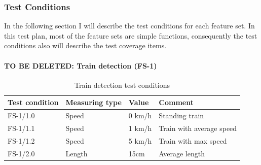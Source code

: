 \subsubsection{Test Conditions} In the following section I will describe the test conditions for each feature set. In this test plan, most of the feature sets are simple functions, consequently the test conditions also will describe the test coverage items.
\paragraph{TO BE DELETED: Train detection (FS-1)}
\begin{table}[H]
\caption{Train detection test conditions}
\label{table:TC-FS-1}
	\begin{center}
		\renewcommand{\arraystretch}{1.8}
		\begin{tabu} 
			to 0.9 \textwidth
			{  X[c] X[c] X[c] X[c] }
			\toprule
			Test condition & Measuring type & Value  & Comment                  \\ \midrule
			FS-1/1.0       & Speed          & 0 km/h & Standing train           \\
			FS-1/1.1       & Speed          & 1 km/h & Train with average speed \\
			FS-1/1.2       & Speed          & 5 km/h & Train with max speed     \\
			FS-1/2.0       & Length         & 15cm   & Average length           \\ \bottomrule
		\end{tabu}
	\end{center}
\end{table} 

